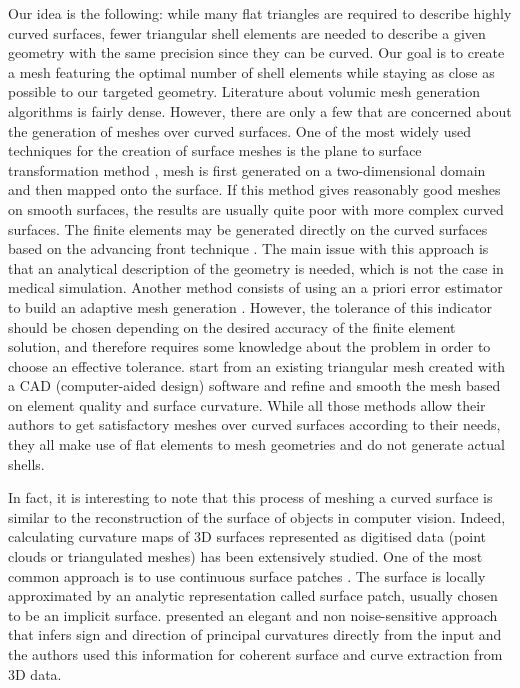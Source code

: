 Our idea is the following: while many flat triangles are required to describe highly curved surfaces, fewer triangular shell elements are needed to describe a given geometry with the same precision since they can be curved. Our goal is to create a mesh featuring the optimal number of shell elements while staying as close as possible to our targeted geometry. Literature about volumic mesh generation algorithms is fairly dense. However, there are only a few that are concerned about the generation of meshes over curved surfaces. One of the most widely used techniques for the creation of surface meshes is the plane to surface transformation method \citep{Zienkiewicz71}, mesh is first generated on a two-dimensional domain and then mapped onto the surface. If this method gives reasonably good meshes on smooth surfaces, the results are usually quite poor with more complex curved surfaces. The finite elements may be generated directly on the curved surfaces based on the advancing front technique \citep{Lo85,Lau96}. The main issue with this approach is that an analytical description of the geometry is needed, which is not the case in medical simulation. Another method consists of using an a priori error estimator to build an adaptive mesh generation \citep{Baumann97}. However, the tolerance of this indicator should be chosen depending on the desired accuracy of the finite element solution, and therefore requires some knowledge about the problem in order to choose an effective tolerance. \cite{Bechet02} start from an existing triangular mesh created with a CAD (computer-aided design) software and refine and smooth the mesh based on element quality and surface curvature. While all those methods allow their authors to get satisfactory meshes over curved surfaces according to their needs, they all make use of flat elements to mesh geometries and do not generate actual shells. 

In fact, it is interesting to note that this process of meshing a curved surface is similar to the reconstruction of the surface of objects in computer vision. Indeed, calculating curvature maps of 3D surfaces represented as digitised data (point clouds or triangulated meshes) has been extensively studied. One of the most common approach is to use continuous surface patches \citep{Kolb95,Douros02}. The surface is locally approximated by an analytic representation called surface patch, usually chosen to be an implicit surface. \cite{Tang99} presented an elegant and non noise-sensitive approach that infers sign and direction of principal curvatures directly from the input and the authors used this information for coherent surface and curve extraction from 3D data. 

